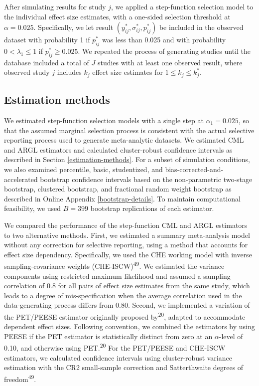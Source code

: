 \documentclass[
  american,
  man, donotrepeattitle,floatsintext]{apa7}
\begin{document}
After simulating results for study \(j\), we applied a step-function selection
model to the individual effect size estimates, with a one-sided selection
threshold at \(\alpha = 0.025\). Specifically, we let result \((y^*_{ij},
\sigma_{ij}^*, p_{ij}^*)\) be included in the observed dataset with probability
1 if \(p_{ij}^*\) was less than 0.025 and with probability \(0 < \lambda_1 \leq 1\) if \(p_{ij}^* \ge 0.025\).
We repeated the process of generating studies until the database included a total of \(J\) studies with at least one observed result, where observed study \(j\) includes \(k_j\) effect size estimates for \(1 \leq k_j \leq k_j^*\).

\subsection{Estimation methods}\label{estimation-methods-1}

We estimated step-function selection models with a single step at \(\alpha_1 = 0.025\), so that the assumed marginal selection process is consistent with the actual selective reporting process used to generate meta-analytic datasets.
We estimated CML and ARGL estimators and calculated cluster-robust confidence intervals as described in Section \ref{estimation-methods}.
For a subset of simulation conditions, we also examined percentile, basic, studentized, and bias-corrected-and-accelerated bootstrap confidence intervals based on the non-parametric two-stage bootstrap, clustered bootstrap, and fractional random weight bootstrap as described in Online Appendix \ref{bootstrap-details}.
To maintain computational feasibility, we used \(B = 399\) bootstrap replications of each estimator.

We compared the performance of the step-function CML and ARGL estimators to two alternative methods.
First, we estimated a summary meta-analysis model without any correction for selective reporting, using a method that accounts for effect size dependency.
Specifically, we used the CHE working model with inverse sampling-covariance weights (CHE-ISCW)\textsuperscript{49}.
We estimated the variance components using restricted maximum likelihood and assumed a sampling correlation of 0.8 for all pairs of effect size estimates from the same study, which leads to a degree of mis-specification when the average correlation used in the data-generating process differs from 0.80.
Second, we implemented a variation of the PET/PEESE estimator originally proposed by\textsuperscript{20}, adapted to accommodate dependent effect sizes.
Following convention, we combined the estimators by using PEESE if the PET estimator is statistically distinct from zero at an \(\alpha\)-level of 0.10, and otherwise using PET.\textsuperscript{20}
For the PET/PEESE and CHE-ISCW estimators, we calculated confidence intervals using cluster-robust variance estimation with the CR2 small-sample correction and Satterthwaite degrees of freedom\textsuperscript{49}.
\end{document}
